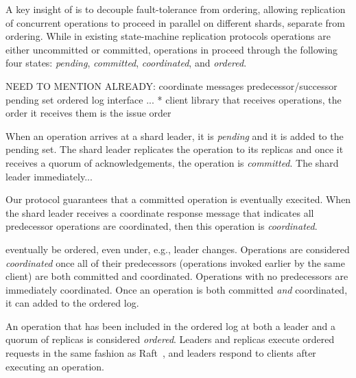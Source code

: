 
A key insight of \sys{} is to decouple fault-tolerance from ordering,
allowing replication of concurrent operations to proceed in parallel
on different shards, separate from ordering. While in existing
state-machine replication protocols operations are either uncommitted
or committed, operations in \sys{} proceed through the following four
states:
\textit{pending},
\textit{committed},
\textit{coordinated},
and
\textit{ordered}.



NEED TO MENTION ALREADY:
coordinate messages
predecessor/successor
pending set
ordered log
interface ...
* client library that receives operations, the order it receives them is the issue order

When an operation arrives at a shard leader, it is \textit{pending} and it is added to the pending set.
The shard leader replicates the operation to its replicas and once it receives a quorum of acknowledgements,
the operation is \textit{committed}.
The shard leader immediately...



Our protocol guarantees that a committed operation is eventually execited.
When the shard leader receives a coordinate response message that indicates all predecessor operations are coordinated, then this operation is \textit{coordinated}.


eventually be ordered, even under, e.g., leader changes. Operations are
considered \textit{coordinated} once all of their predecessors (operations
invoked earlier by the same client) are both committed and coordinated.
Operations with no predecessors are immediately coordinated. Once an operation
is both committed \emph{and} coordinated, it can added to the ordered log.

An
operation that has been included in the ordered log at both a leader and a
quorum of replicas is considered \textit{ordered}. Leaders and replicas execute
ordered requests in the same fashion as Raft~\cite{ongaro2014raft}, and leaders
respond to clients after executing an operation.

